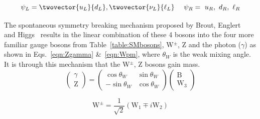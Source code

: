 \begin{equation*}
\psi_L = \twovector{u_L}{d_L}, \twovector{\nu_L}{\ell_L}~~~~\psi_R=~u_R,~d_R,~\ell_R
\end{equation*}

The spontaneous symmetry breaking mechanism proposed by Brout, Englert~\cite{PhysRevLett.13.321} and Higgs~\cite{PhysRevLett.13.508} results in the linear combination of these 4 bosons into the four more familiar gauge bosons from Table~\ref{table:SMbosons}, W$^{\pm}$, Z and the photon ($\gamma$) as shown in Eqs.~\ref{eqn:Zgamma} \&~\ref{eqn:Wpm}, where $\theta_{W}$ is the weak mixing angle. It is through this mechanism that the W$^{\pm}$, Z bosons gain mass.
\begin{equation}
\label{eqn:Zgamma}
{\begin{pmatrix}
\gamma \\
\textrm{Z} 
\end{pmatrix}}
=
{\begin{pmatrix}
\cos\theta_{W} & \sin\theta_{W} \\
-\sin\theta_{W} & \cos\theta_{W} 
\end{pmatrix}}
{\begin{pmatrix}
\textrm {B} \\
\textrm{W}_{3}
\end{pmatrix}}
\end{equation}

\begin{equation}
\label{eqn:Wpm}
\textrm{W}^{\pm}=\frac{1}{\sqrt{2}}\left(\textrm{W}_{1}\mp i\textrm{W}_{2}\right)
\end{equation}



